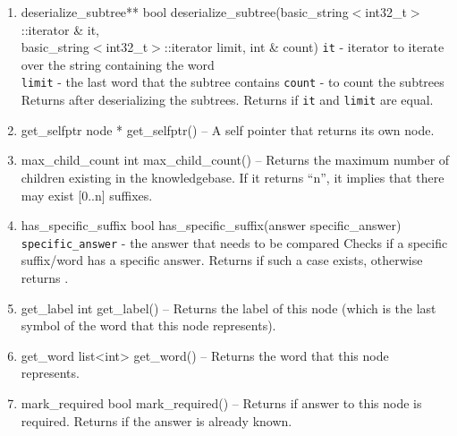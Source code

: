 \begin{enumerate}
\begin{detail}
{Converts the subtree into \stringtype and appended to \texttt{into}. This method is used during serialization} 
\end{detail}
\item \begin{detail}
{deserialize\_subtree**}
{bool deserialize\_subtree(basic\_string$<$int32\_t$>$::iterator \& it, \\ basic\_string$<$int32\_t$>$::iterator limit, int \& count)}
{
\texttt{it} - iterator to iterate over the string containing the word \\
\texttt{limit} - the last word that the subtree contains
\texttt{count} - \integer to count the subtrees
 }
{Returns \true after deserializing the subtrees. Returns \false if \texttt{it} and \texttt{limit} are equal.} 
\end{detail}
\item \begin{detail}
{get\_selfptr}
{node * get\_selfptr()}
{--}
{A self pointer that returns its own node.} 
\end{detail}
\item \begin{detail}
{max\_child\_count}
{int max\_child\_count()}
{--}
{Returns the maximum number of children existing in the knowledgebase. If it returns ``n'', it implies that there may exist [0..n] suffixes.} 
\end{detail}
\item \begin{detail}
{has\_specific\_suffix}
{bool has\_specific\_suffix(answer specific\_answer)}
{\texttt{specific\_answer} - the answer that needs to be compared}
{Checks if a specific suffix/word has a specific answer. Returns \true if such a case exists, otherwise returns \false.} 
\end{detail}
\item \begin{detail}
{get\_label}
{int get\_label()}
{--}
{Returns the label of this node (which is the last symbol of the word that this node represents).} 
\end{detail}
\item \begin{detail}
{get\_word}
{list<int> get\_word()}
{--}
{Returns the word that this node represents.} 
\end{detail}
\item \begin{detail}
{mark\_required}
{bool mark\_required()}
{--}
{Returns \true if answer to this node is required. Returns \false if the answer is already known.} 

\end{detail}
\end{enumerate}
